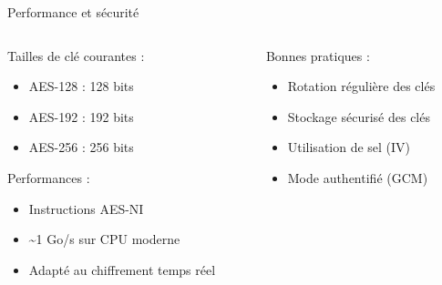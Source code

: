 \begin{frame}{Performance et sécurité}
  \begin{columns}
    \begin{column}{0.5\textwidth}
      Tailles de clé courantes :
      \begin{itemize}
        \item AES-128 : 128 bits
        \item AES-192 : 192 bits
        \item AES-256 : 256 bits
      \end{itemize}

      Performances :
      \begin{itemize}
        \item Instructions AES-NI
        \item \textasciitilde 1 Go/s sur CPU moderne
        \item Adapté au chiffrement temps réel
      \end{itemize}
    \end{column}

    \begin{column}{0.5\textwidth}
      Bonnes pratiques :
      \begin{itemize}
        \item Rotation régulière des clés
        \item Stockage sécurisé des clés
        \item Utilisation de sel (IV)
        \item Mode authentifié (GCM)
      \end{itemize}
    \end{column}
  \end{columns}
\end{frame}